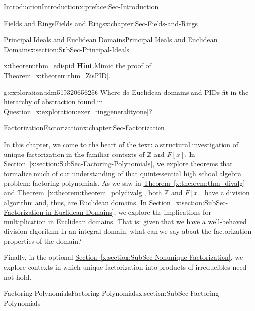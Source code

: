 \documentclass[oneside,10pt,]{book}
\newcommand{\blocktitlefont}{\relax}
\newcommand{\xreffont}{\relax}
\numberwithin{equation}{section}
\def\Z{{\mathbb Z}}
\begin{document}
\begin{preface}{Introduction}{}{Introduction}{}{}{x:preface:Sec-Introduction}
\begin{chapterptx}{Fields and Rings}{}{Fields and Rings}{}{}{x:chapter:Sec-Fields-and-Rings}
\begin{sectionptx}{Principal Ideals and Euclidean Domains}{}{Principal Ideals and Euclidean Domains}{}{}{x:section:SubSec-Principal-Ideals}
\begin{theorem}{}{}{x:theorem:thm_edispid}
\textbf{\blocktitlefont Hint}.\quad{}Mimic the proof of \hyperref[x:theorem:thm_ZisPID]{Theorem~{\xreffont\ref{x:theorem:thm_ZisPID}}}.%
\end{theorem}
\begin{exploration}{}{g:exploration:idm519320656256}%
Where do Euclidean domains and PIDs fit in the hierarchy of abstraction found in \hyperref[x:exploration:exer_ringgeneralityone]{Question~{\xreffont\ref{x:exploration:exer_ringgeneralityone}}}?%
\end{exploration}
\end{sectionptx}
\end{chapterptx}
%
%
\typeout{************************************************}
\typeout{************************************************}
%
\begin{chapterptx}{Factorization}{}{Factorization}{}{}{x:chapter:Sec-Factorization}
\begin{introduction}{}%
In this chapter, we come to the heart of the text: a structural investigation of unique factorization in the familiar contexts of \(\Z\) and \(F[x]\). In \hyperref[x:section:SubSec-Factoring-Polynomials]{Section~{\xreffont\ref{x:section:SubSec-Factoring-Polynomials}}}, we explore theorems that formalize much of our understanding of that quintessential high school algebra problem: factoring polynomials. As we saw in \hyperref[x:theorem:thm_divalg]{Theorem~{\xreffont\ref{x:theorem:thm_divalg}}} and \hyperref[x:theorem:theorem_polydivalg]{Theorem~{\xreffont\ref{x:theorem:theorem_polydivalg}}}, both \(\Z\) and \(F[x]\) have a division algorithm and, thus, are Euclidean domains. In \hyperref[x:section:SubSec-Factorization-in-Euclidean-Domains]{Section~{\xreffont\ref{x:section:SubSec-Factorization-in-Euclidean-Domains}}}, we explore the implications for multiplication in Euclidean domains. That is: given that we have a well-behaved division algorithm in an integral domain, what can we say about the factorization properties of the domain?%
\par
Finally, in the optional \hyperref[x:section:SubSec-Nonunique-Factorization]{Section~{\xreffont\ref{x:section:SubSec-Nonunique-Factorization}}}, we explore contexts in which unique factorization into products of irreducibles need not hold.%
\end{introduction}%
%
%
\typeout{************************************************}
\typeout{************************************************}
%
\begin{sectionptx}{Factoring Polynomials}{}{Factoring Polynomials}{}{}{x:section:SubSec-Factoring-Polynomials}

\end{sectionptx}
\end{chapterptx}
\end{preface}
\end{document}
